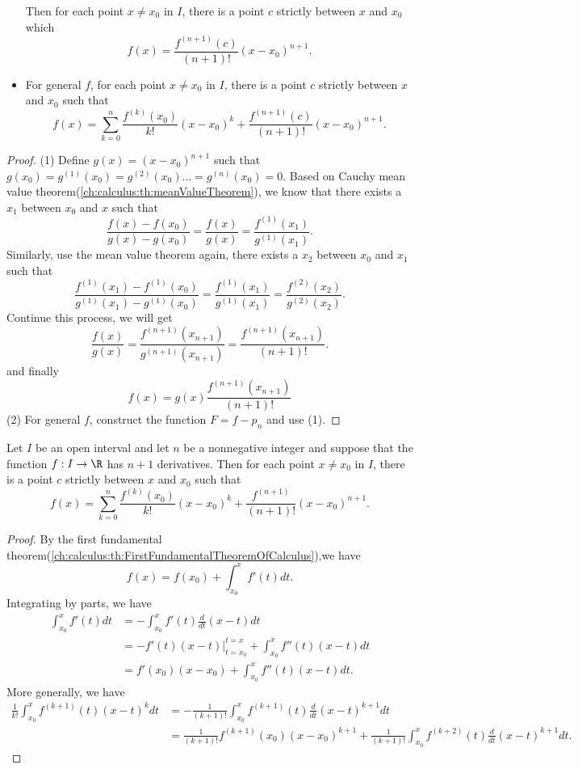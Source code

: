 \begin{refsection}
\begin{theorem}
\begin{itemize}
		Then for each point $x\neq x_0$ in $I$, there is a point $c$ strictly between $x$ and $x_0$ which
		$$f(x) =\frac{f^{(n+1)}(c)}{(n+1)!}(x-x_0)^{n+1}. $$
		
		\item For general $f$, for each point $x\neq x_0$ in $I$, there is a point $c$ strictly between $x$ and $x_0$ such that
		$$f(x) = \sum_{k=0}^n \frac{f^{(k)}(x_0)}{k!}(x-x_0)^k + \frac{f^{(n+1)}(c)}{(n+1)!}(x-x_0)^{n+1}.$$ 
	\end{itemize}
\end{theorem}
\begin{proof}
	(1) Define $g(x) = (x-x_0)^{n+1}$ such that $g(x_0) = g^{(1)}(x_0) = g^{(2)}(x_0) ...= g^{(n)}(x_0) = 0$. 
	Based on Cauchy mean value theorem(\autoref{ch:calculus:th:meanValueTheorem}), we know that there exists a $x_1$ between $x_0$ and $x$ such that
	$$\frac{f(x)-f(x_0)}{g(x)-g(x_0)} = \frac{f(x)}{g(x)} =\frac{f^{(1)}(x_1)}{g^{(1)}(x_1)}.$$
	Similarly, use the mean value theorem again, there exists a $x_2$ between $x_0$ and $x_1$ such that
	$$\frac{f^{(1)}(x_1)-f^{(1)}(x_0)}{g^{(1)}(x_1)-g^{(1)}(x_0)} = \frac{f^{(1)}(x_1)}{g^{(1)}(x_1)} =\frac{f^{(2)}(x_2)}{g^{(2)}(x_2)}.$$
	Continue this process, we will get
	$$\frac{f(x)}{g(x)} =\frac{f^{(n+1)}(x_{n+1})}{g^{(n+1)}(x_{n+1})} =\frac{f^{(n+1)}(x_{n+1})}{(n+1)!}.$$
	and finally
	$$f(x) = g(x)\frac{f^{(n+1)}(x_{n+1})}{(n+1)!}$$
	(2) For general $f$, construct the function $F = f- p_n$ and use (1).
	
\end{proof}


\begin{theorem}\cite[216]{fitzpatrick2006advanced}
	Let $I$ be an open interval and let $n$ be a nonnegative integer and suppose that the function $f:I\to \R$ has $n+1$ derivatives. Then for each point $x\neq x_0$ in $I$, there is a point $c$ strictly between $x$ and $x_0$ such that
	$$f(x) = \sum_{k=0}^n \frac{f^{(k)}(x_0)}{k!}(x-x_0)^k + \frac{f^{(n+1)}}{(n+1)!}(x-x_0)^{n+1}.$$ 	
\end{theorem}
\begin{proof}
	By the first  fundamental theorem(\autoref{ch:calculus:th:FirstFundamentalTheoremOfCalculus}),we have
	$$f(x) = f(x_0) + \int_{x_0}^x f'(t)dt.$$
	Integrating by parts, we have
	\begin{align*}
	\int_{x_0}^x f'(t)dt &= - \int_{x_0}^x f'(t)\frac{d}{dt}(x-t)dt \\
	&= -f'(t)(x-t)|^{t=x}_{t=x_0} +  \int_{x_0}^x f''(t)(x-t)dt \\
	&= f'(x_0)(x-x_0) + \int_{x_0}^x f''(t)(x-t)dt.
	\end{align*}	
	More generally, we have
	\begin{align*}
	\frac{1}{k!}\int_{x_0}^x f^{(k+1)}(t)(x-t)^k dt &= -\frac{1}{(k+1)!} \int_{x_0}^x f^{(k+1)}(t)\frac{d}{dt}(x-t)^{k+1}dt \\
	&= \frac{1}{(k+1)!} f^{(k+1)}(x_0)(x-x_0)^{k+1} + \frac{1}{(k+1)!} \int_{x_0}^x f^{(k+2)}(t)\frac{d}{dt}(x-t)^{k+1}dt.
	\end{align*}	
	

\end{proof}
\end{refsection}
